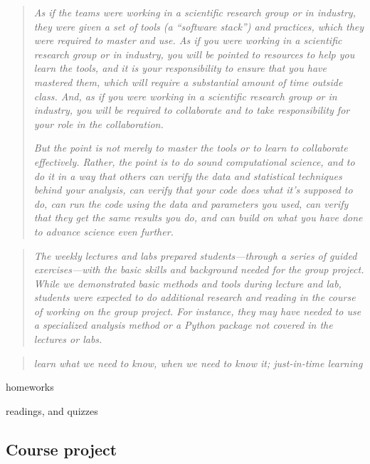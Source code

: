 \begin{quote}\emph{
As if the teams were working in a scientific research group or in industry, they were
given a set of tools (a ``software stack'') and practices, which they were required to
master and use. As if you were working in a scientific research group or in
industry, you will be pointed to resources to help you learn the tools, and it
is your responsibility to ensure that you have mastered them, which will
require a substantial amount of time outside class. And, as if you were working
in a scientific research group or in industry, you will be required to
collaborate and to take responsibility for your role in the collaboration.
}

\emph{
But the point is not merely to master the tools or to learn to collaborate
effectively.  Rather, the point is to do sound computational science, and to do
it in a way that others can verify the data and statistical techniques behind
your analysis, can verify that your code does what it's supposed to do, can run
the code using the data and parameters you used, can verify that they get the
same results you do, and can build on what you have done to advance science
even further.
}\end{quote}


\begin{quote}\emph{
The weekly lectures and labs prepared students---through a
series of guided exercises---with the basic skills and
background needed for the group project.
While we demonstrated basic methods and tools during lecture and lab,
students were expected to do additional research and reading in the course
of working on the group project.
For instance, they may have needed to use a specialized analysis
method or a Python package not covered in the lectures or labs.
}\end{quote}

\begin{quote}\emph{
learn what we need to know, when we need to know it; just-in-time learning 
}\end{quote}

homeworks

readings, and quizzes


\subsection{Course project}\label{project}

